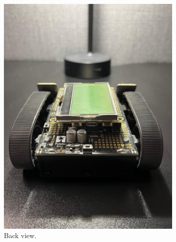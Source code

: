 \documentclass{l4proj}
\begin{document}
\begin{figure}
\begin{subfigure}{0.24\textwidth}
        \includegraphics[width=\textwidth]{images/robot-back.jpg}
        \caption{Back view.}
        \label{fig:back-view}  
    \end{subfigure}
    \begin{subfigure}{0.24\textwidth}
        \centering

\end{subfigure}
\end{figure}
\end{document}
